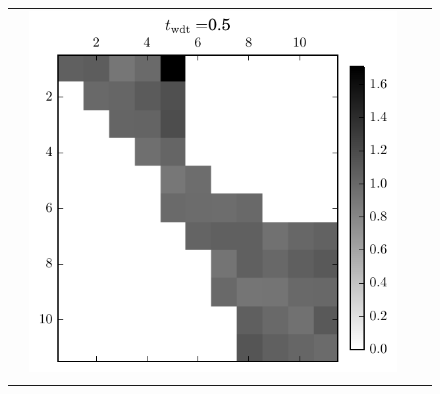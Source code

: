 \begin{figure}[h]
\begin{tabular}{cccc}
    &
    \includegraphics[scale=0.75]{images/results/matshows/homog_sp0_matshow_4}
    \\
    &  \\
    \end{tabular}
\end{figure}

